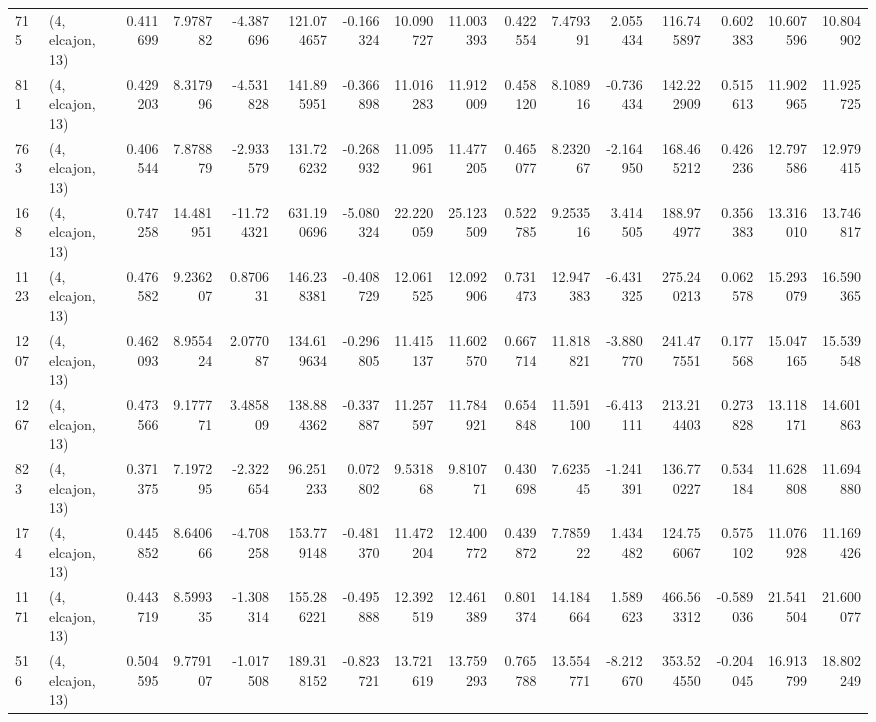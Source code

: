 \begin{tabular}{llrrrrrrrrrrrrrr}
715  &  (4, elcajon, 13) &   0.411699 &   7.978782 &  -4.387696 &    121.074657 &   -0.166324 &   10.090727 &   11.003393 &  0.422554 &   7.479391 &   2.055434 &   116.745897 &   0.602383 &  10.607596 &  10.804902 \\
811  &  (4, elcajon, 13) &   0.429203 &   8.317996 &  -4.531828 &    141.895951 &   -0.366898 &   11.016283 &   11.912009 &  0.458120 &   8.108916 &  -0.736434 &   142.222909 &   0.515613 &  11.902965 &  11.925725 \\
763  &  (4, elcajon, 13) &   0.406544 &   7.878879 &  -2.933579 &    131.726232 &   -0.268932 &   11.095961 &   11.477205 &  0.465077 &   8.232067 &  -2.164950 &   168.465212 &   0.426236 &  12.797586 &  12.979415 \\
168  &  (4, elcajon, 13) &   0.747258 &  14.481951 & -11.724321 &    631.190696 &   -5.080324 &   22.220059 &   25.123509 &  0.522785 &   9.253516 &   3.414505 &   188.974977 &   0.356383 &  13.316010 &  13.746817 \\
1123 &  (4, elcajon, 13) &   0.476582 &   9.236207 &   0.870631 &    146.238381 &   -0.408729 &   12.061525 &   12.092906 &  0.731473 &  12.947383 &  -6.431325 &   275.240213 &   0.062578 &  15.293079 &  16.590365 \\
1207 &  (4, elcajon, 13) &   0.462093 &   8.955424 &   2.077087 &    134.619634 &   -0.296805 &   11.415137 &   11.602570 &  0.667714 &  11.818821 &  -3.880770 &   241.477551 &   0.177568 &  15.047165 &  15.539548 \\
1267 &  (4, elcajon, 13) &   0.473566 &   9.177771 &   3.485809 &    138.884362 &   -0.337887 &   11.257597 &   11.784921 &  0.654848 &  11.591100 &  -6.413111 &   213.214403 &   0.273828 &  13.118171 &  14.601863 \\
823  &  (4, elcajon, 13) &   0.371375 &   7.197295 &  -2.322654 &     96.251233 &    0.072802 &    9.531868 &    9.810771 &  0.430698 &   7.623545 &  -1.241391 &   136.770227 &   0.534184 &  11.628808 &  11.694880 \\
174  &  (4, elcajon, 13) &   0.445852 &   8.640666 &  -4.708258 &    153.779148 &   -0.481370 &   11.472204 &   12.400772 &  0.439872 &   7.785922 &   1.434482 &   124.756067 &   0.575102 &  11.076928 &  11.169426 \\
1171 &  (4, elcajon, 13) &   0.443719 &   8.599335 &  -1.308314 &    155.286221 &   -0.495888 &   12.392519 &   12.461389 &  0.801374 &  14.184664 &   1.589623 &   466.563312 &  -0.589036 &  21.541504 &  21.600077 \\
516  &  (4, elcajon, 13) &   0.504595 &   9.779107 &  -1.017508 &    189.318152 &   -0.823721 &   13.721619 &   13.759293 &  0.765788 &  13.554771 &  -8.212670 &   353.524550 &  -0.204045 &  16.913799 &  18.802249 \\

\end{tabular}
